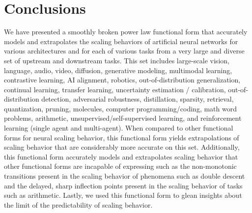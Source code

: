 \documentclass{article} %
\begin{document}
\section{Conclusions}
We have presented a smoothly broken power law functional form that accurately models and extrapolates the scaling behaviors of artificial neural networks for various architectures and for each of various tasks from a very large and diverse set of upstream and downstream tasks. This set includes large-scale vision, language, audio, video, diffusion, generative modeling, multimodal learning, contrastive learning, AI alignment, robotics, out-of-distribution generalization, continual learning, transfer learning, uncertainty estimation / calibration, out-of-distribution detection, adversarial robustness, distillation, sparsity, retrieval, quantization, pruning, molecules, computer programming/coding, math word problems, arithmetic, unsupervised/self-supervised learning, and reinforcement learning (single agent and multi-agent). When compared to other functional forms for neural scaling behavior, this functional form yields extrapolations of scaling behavior that are considerably more accurate on this set. Additionally, this functional form accurately models and extrapolates scaling behavior that other functional forms are incapable of expressing such as the non-monotonic transitions present in the scaling behavior of phenomena such as double descent and the delayed, sharp inflection points present in the scaling behavior of tasks such as arithmetic. Lastly, we used this functional form to glean insights about the limit of the predictability of scaling behavior.


\end{document}
